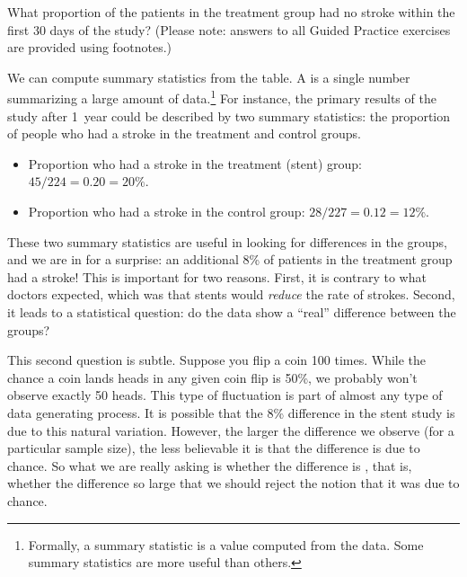 \begin{exercisewrap}
\begin{nexercise}
What proportion of the patients in the treatment group had no stroke within the first 30 days of the study? (Please note: answers to all Guided Practice exercises are provided using footnotes.)\footnotemark
\end{nexercise}
\end{exercisewrap}

We can compute summary statistics from the table. A  is a single number summarizing a large amount of data.\footnote{Formally, a summary statistic is a value computed from the data. Some summary statistics are more useful than others.} For instance, the primary results of the study after 1~year could be described by two summary statistics: the proportion of people who had a stroke in the treatment and control groups.
\begin{itemize}
\setlength{\itemsep}{0mm}
\item[] Proportion who had a stroke in the treatment (stent) group: $45/224 = 0.20 = 20\%$.
\item[] Proportion who had a stroke in the control group: $28/227 = 0.12 = 12\%$.
\end{itemize}
These two summary statistics are useful in looking for differences in the groups, and we are in for a surprise: an additional 8\% of patients in the treatment group had a stroke! This is important for two reasons. First, it is contrary to what doctors expected, which was that stents would \emph{reduce} the rate of strokes. Second, it leads to a statistical question: do the data show a ``real'' difference between the groups?

This second question is subtle. Suppose you flip a coin 100 times. While the chance a coin lands heads in any given coin flip is 50\%, we probably won't observe exactly 50 heads. This type of fluctuation is part of almost any type of data generating process. It is possible that the 8\% difference in the stent study is due to this natural variation. However, the larger the difference we observe (for a particular sample size), the less believable it is that the difference is due to chance. So what we are really asking is whether the difference is , that is, whether the difference so large that we should reject the notion that it was due to chance. 

